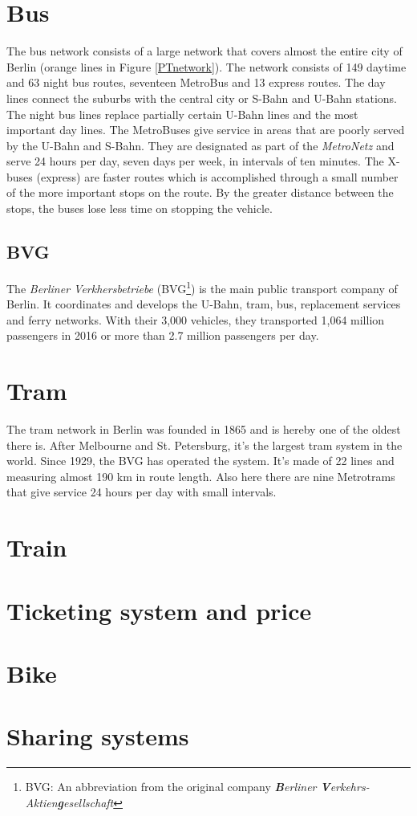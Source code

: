 \section{Bus}

The bus network consists of a large network that covers almost the entire city of Berlin (orange lines in Figure \ref{PTnetwork}). The network consists of 149 daytime and 63 night bus routes, seventeen MetroBus and 13 express routes.  The day lines connect the suburbs with the central city or S-Bahn and U-Bahn stations. The night bus lines replace partially certain U-Bahn lines and the most important day lines. The MetroBuses give service in areas that are poorly served by the U-Bahn and S-Bahn. They are designated as part of the \textit{MetroNetz} and serve 24 hours per day, seven days per week, in intervals of ten minutes. The X-buses (express) are faster routes which is accomplished through a small number of the more important stops on the route. By the greater distance between the stops, the buses lose less time on stopping the vehicle\cite{xpress}. \\

\subsection*{BVG}
The \textit{Berliner Verkhersbetriebe} (BVG\footnote{BVG: An abbreviation from the original company \textit{\textbf{B}erliner \textbf{V}erkehrs-Aktien\textbf{g}esellschaft}}) is the main public transport company of Berlin. It coordinates and develops the U-Bahn, tram, bus, replacement services and ferry networks\cite{BVG1}. With their 3,000 vehicles, they transported 1,064 million passengers in 2016 or more than 2.7 million passengers per day\cite{MobilityCity}.


\section{Tram}
 The tram network in Berlin was founded in 1865 and is hereby one of the oldest there is. After Melbourne and St. Petersburg, it's the largest tram system in the world. Since 1929, the BVG has operated the system. It's made of 22 lines and measuring almost 190 km in route length. Also here there are nine Metrotrams that give service 24 hours per day with small intervals.

\section{Train}


\section{Ticketing system and price}


\section{Bike}


\section{Sharing systems}

